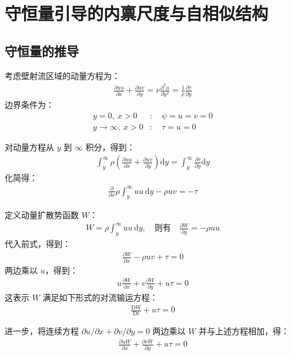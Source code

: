 \section{守恒量引导的内禀尺度与自相似结构}

\subsection{守恒量的推导}

考虑壁射流区域的动量方程为：
\begin{align}
    \frac{\partial uu}{\partial x} + \frac{\partial uv}{\partial y} = \nu\frac{\partial^{2} u}{\partial y^{2}} = \frac{1}{\rho}\frac{\partial\tau}{\partial y}
\end{align}
边界条件为：
\begin{align}
    y=0,\ x>0&:\quad \psi = u = v = 0\\
    y\rightarrow \infty,\ x>0&:\quad \tau = u = 0
\end{align}

对动量方程从 $y$ 到 $\infty$ 积分，得到：
\begin{align}
    \int_{y}^{\infty} \rho\left(\frac{\partial uu}{\partial x} + \frac{\partial uv}{\partial y}\right)\mathrm{d}y = \int_{y}^{\infty} \frac{\partial\tau}{\partial y}\mathrm{d}y
\end{align}
化简得：
\begin{align}
    \frac{\partial}{\partial x} \rho\int_{y}^{\infty} uu\,\mathrm{d}y - \rho uv = -\tau
\end{align}

定义动量扩散势函数 $W$：
\begin{align}
    W = \rho \int_{y}^{\infty} uu\,\mathrm{d}y, \quad \text{则有} \quad \frac{\partial W}{\partial y} = -\rho uu
\end{align}
代入前式，得到：
\begin{align}
    \frac{\partial W}{\partial x} - \rho uv + \tau = 0
\end{align}
两边乘以 $u$，得到：
\begin{align}
    u\frac{\partial W}{\partial x} + v\frac{\partial W}{\partial y} + u\tau = 0
\end{align}
这表示 $W$ 满足如下形式的对流输运方程：
\begin{align}
    \frac{\mathrm{D}W}{\mathrm{D}t} + u\tau = 0
    \label{eq-dFdt}
\end{align}

进一步，将连续方程 $\partial u/\partial x + \partial v/\partial y = 0$ 两边乘以 $W$ 并与上述方程相加，得：
\begin{align}
    \frac{\partial uW}{\partial x} + \frac{\partial vW}{\partial y} + u\tau = 0
\end{align}


